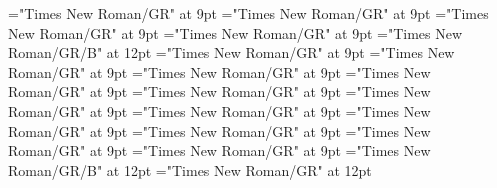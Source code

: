 \documentclass[gps1,twoside]{article}
\begin{document}
\font\spanowningentrysummarydefinitionvisiblecomplexformbackrefvisiblecomplexformbackrefssensesensessensesensessubentrysubentriesentrylastchildafter="Times New Roman/GR" at 9pt
\font\nontrivialentryrootnontrivialentryrootnontrivialentryrootsvisiblecomplexformbackrefvisiblecomplexformbackrefssensesensessensesensessubentrysubentriesentrybefore="Times New Roman/GR" at 9pt
\font\nontrivialentryrootsvisiblecomplexformbackrefvisiblecomplexformbackrefssensesensessensesensessubentrysubentriesentrybefore="Times New Roman/GR" at 9pt
\font\nontrivialentryrootsvisiblecomplexformbackrefvisiblecomplexformbackrefssensesensessensesensessubentrysubentriesentryafter="Times New Roman/GR" at 9pt
\font\nontrivialentryrootnontrivialentryrootsvisiblecomplexformbackrefvisiblecomplexformbackrefssensesensessensesensessubentrysubentriesentry="Times New Roman/GR/B" at 12pt
\font\complexformsnotsubentrycomplexformsnotsubentrycomplexformsnotsubentriessubentrysubentriesentrybefore="Times New Roman/GR" at 9pt
\font\complexformsnotsubentriessubentrysubentriesentryafter="Times New Roman/GR" at 9pt
\font\complexformtypescomplexformsnotsubentrycomplexformsnotsubentriessubentrysubentriesentryafter="Times New Roman/GR" at 9pt
\font\spanspanreverseabbrcomplexformtypecomplexformtypescomplexformsnotsubentrycomplexformsnotsubentriessubentrysubentriesentrybefore="Times New Roman/GR" at 9pt
\font\spanspanheadwordcomplexformsnotsubentrycomplexformsnotsubentriessubentrysubentriesentrybefore="Times New Roman/GR" at 9pt
\font\spanspanowningentrysummarydefinitioncomplexformsnotsubentrycomplexformsnotsubentriessubentrysubentriesentrybefore="Times New Roman/GR" at 9pt
\font\spanowningentrysummarydefinitioncomplexformsnotsubentrycomplexformsnotsubentriessubentrysubentriesentryfirstchildbefore="Times New Roman/GR" at 9pt
\font\spanowningentrysummarydefinitioncomplexformsnotsubentrycomplexformsnotsubentriessubentrysubentriesentrylastchildafter="Times New Roman/GR" at 9pt
\font\nontrivialentryrootnontrivialentryrootnontrivialentryrootscomplexformsnotsubentrycomplexformsnotsubentriessubentrysubentriesentrybefore="Times New Roman/GR" at 9pt
\font\nontrivialentryrootscomplexformsnotsubentrycomplexformsnotsubentriessubentrysubentriesentrybefore="Times New Roman/GR" at 9pt
\font\nontrivialentryrootscomplexformsnotsubentrycomplexformsnotsubentriessubentrysubentriesentryafter="Times New Roman/GR" at 9pt
\font\nontrivialentryrootnontrivialentryrootscomplexformsnotsubentrycomplexformsnotsubentriessubentrysubentriesentry="Times New Roman/GR/B" at 12pt
\font\picturepicturessubentrysubentriesentry="Times New Roman/GR" at 12pt
\end{document}
